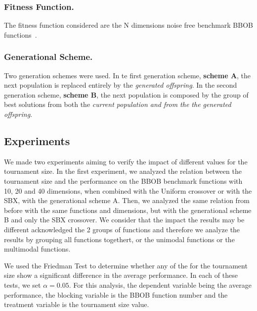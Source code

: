 \subsubsection*{Fitness Function.}
The fitness function considered are the N dimensions noise free benchmark BBOB functions~\cite{hansen2010real}.





\subsubsection*{Generational Scheme.}
Two generation schemes were used. In te first generation scheme, \textbf{scheme A}, the next population is replaced entirely by the \textit{generated offspring}. In the second generation scheme, \textbf{scheme B}, the next population is composed by the group of best solutions from both the \textit{current population and from the the generated offspring}.

\label{sec:experiment}

\subsection{Experiments}
We made two experiments aiming to verify the impact of different values for the tournament size. In the first experiment, we analyzed the relation between the tournament size and the performance on the BBOB benchmark functions with 10, 20 and 40 dimensions, when combined with the Uniform crossover or with the SBX, with the generational scheme A. Then, we analyzed the same relation from before with the same functions and dimensions, but with the generational scheme B and only the SBX crossover. We consider that the impact the results may be different acknowledged the 2 groups of functions and therefore we analyze the results by grouping all functions togethert, or the unimodal functions or the multimodal functions. 

We used the Friedman Test to determine whether any of the for the tournament size show a significant difference in the average performance. In each of these tests, we set $\alpha = 0.05$. For this analysis, the dependent variable being the average performance, the blocking variable is the BBOB function number and the treatment variable is the tournament size value.



